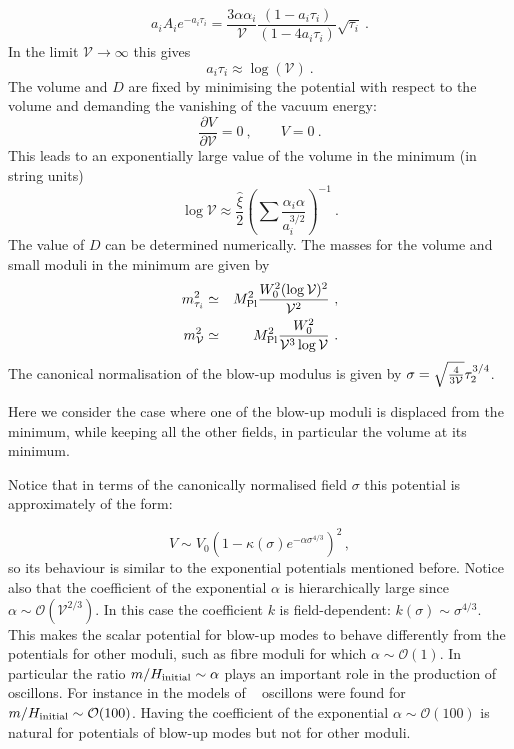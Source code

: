 \documentclass[12pt]{article}
\newcommand{\be}{\begin{equation}}
\newcommand{\ee}{\end{equation}}
\newcommand{\V}{\mathcal{V}}
\begin{document}
\begin{equation}
a_i A_i e^{-a_i\tau_i}=\frac{3\alpha\alpha_i}{\V}\frac{(1-a_i\tau_i)}{(1-4a_i \tau_i)}\sqrt{\tau_i}~.
\end{equation}
In the limit $\V\to \infty$ this gives
\begin{equation}
a_i \tau_i\approx \log{(\V)}~.
\end{equation}
The volume and $D$ are fixed by minimising the potential with respect to the volume and demanding the vanishing of the vacuum energy:
\begin{equation}
\frac{\partial V}{\partial \V}=0~,\qquad V=0~.
\end{equation}
This leads to an exponentially large value of the volume in the minimum (in string units)
\begin{equation}
\log{\V}\approx \frac{\hat{\xi}}{2}\left(\sum\frac{\alpha_i \alpha}{a_i^{3/2}}\right)^{-1}~.
\end{equation}
The value of $D$ can be determined numerically. The masses for the volume and small moduli in the minimum are given by
\begin{eqnarray}
m_{\tau_i}^2&\simeq & M^2_{\rm Pl}\frac{W_0^2 (\log{\V})^2}{\V^2}~,\\
m_{\V}^2&\simeq & M^2_{\rm Pl}\frac{W_0^2 }{\V^{3}\log{\V}}~.
\end{eqnarray}
The canonical normalisation of the blow-up modulus is given by $\sigma=\sqrt{\frac{4}{3{\cal V}}}\tau_2^{3/4}$.

Here we consider the case where one of the blow-up moduli is displaced from the minimum, while keeping all the other fields, in particular the volume at its minimum. 

Notice that in terms of the canonically normalised field $\sigma$ this potential is approximately of the form:

\be
V\sim V_0\left(1-\kappa(\sigma) e^{-\alpha \sigma^{4/3}}\right)^2\,,
\ee
so its behaviour is similar to the exponential potentials mentioned before. Notice also that the coefficient of the exponential $\alpha$ is hierarchically large since 
$\alpha\sim \mathcal{O}(\mathcal{V}^{2/3})$. In this case the coefficient $k$ is field-dependent: $k(\sigma) \sim \sigma^{4/3}$. This makes the scalar potential for blow-up modes to behave differently from the potentials for other moduli, such as fibre moduli for which $\alpha\sim \mathcal{O}(1)$. In particular the ratio $m/H_{\rm initial}\sim \alpha$ plays an important role in the production of oscillons. For instance in the models of ~\cite{Antusch:2016con} oscillons were found for $m/H_{\rm initial}\sim \mathcal{O}(100)$. Having the coefficient of the exponential $\alpha\sim\mathcal{O}(100)$ is natural for potentials of blow-up modes but not for other moduli. 
\end{document}

